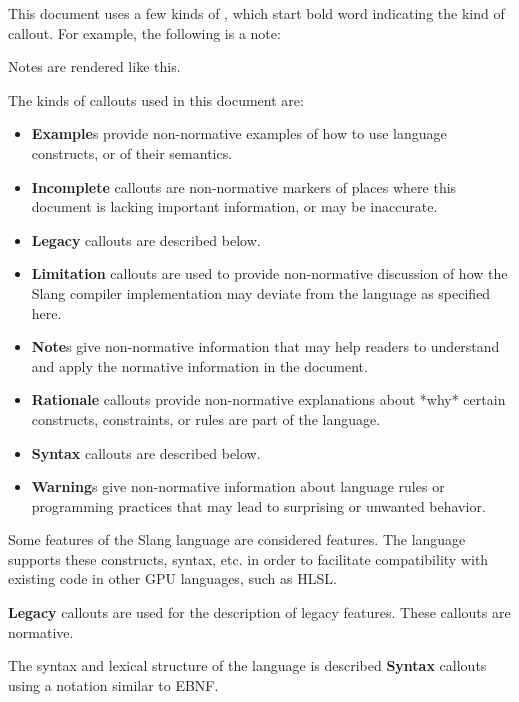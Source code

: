 
This document uses a few kinds of , which start bold word indicating the kind of callout. For example, the following is a note:

\begin{Note}
Notes are rendered like this.
\end{Note}

The kinds of callouts used in this document are:

\begin{itemize}
    \item{\textbf{Example}s provide non-normative examples of how to use language constructs, or of their semantics.}
    \item{\textbf{Incomplete} callouts are non-normative markers of places where this document is lacking important information, or may be inaccurate.}
    \item{\textbf{Legacy} callouts are described below.}
    \item{\textbf{Limitation} callouts are used to provide non-normative discussion of how the Slang compiler implementation may deviate from the language as specified here.}
    \item{\textbf{Note}s give non-normative information that may help readers to understand and apply the normative information in the document.}
    \item{\textbf{Rationale} callouts provide non-normative explanations about *why* certain constructs, constraints, or rules are part of the language.}
    \item{\textbf{Syntax} callouts are described below.}
    \item{\textbf{Warning}s give non-normative information about language rules or programming practices that may lead to surprising or unwanted behavior.}
\end{itemize}


Some features of the Slang language are considered  features.
The language supports these constructs, syntax, etc. in order to facilitate compatibility with existing code in other GPU languages, such as HLSL.

\textbf{Legacy} callouts are used for the description of legacy features. These callouts are normative.


The syntax and lexical structure of the language is described \textbf{Syntax} callouts using a notation similar to EBNF.

